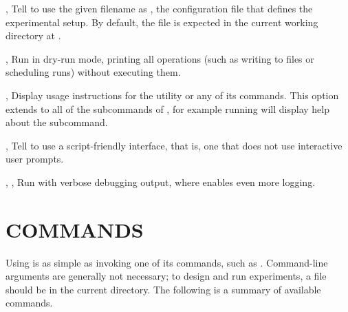 \documentclass[a4paper,english]{article}
\begin{document}
\begin{adjustwidth}{18pt}{0pt}
        \begin{Description}[Options]
            \item[\OptArg{-c}{ filename}, \OptArg{\ddash config}{ filename}]
            Tell  to use the given filename as , the configuration
            file that defines the experimental setup.
            By default, the file is expected in the current working directory at .
            \item[\Opt{-d}, \Opt{\ddash dry-run}]
            Run  in dry-run mode, printing all operations (such as writing to files or scheduling runs)
            without executing them.
            \item[\Opt{-h}, \Opt{\ddash help}]
            Display usage instructions for the  utility or any of its commands.
            This option extends to all of the subcommands of , for example running
               will display help about the  subcommand.
            \item[\Opt{-s}, \Opt{\ddash script}]
            Tell  to use a script-friendly interface, that is, one that does not use
            interactive user prompts.
            \item[\Opt{-v}, \Opt{-vv}, \Opt{--verbose}]
            Run  with verbose debugging output, where  enables even more logging.
        \end{Description}

    \section{COMMANDS}

        Using  is as simple as invoking one of its commands, such as
         .
        Command-line arguments are generally not necessary; to design and run
        experiments, a  file should be in the current directory.
        The following is a summary of available commands.


\end{adjustwidth}
\end{document}

